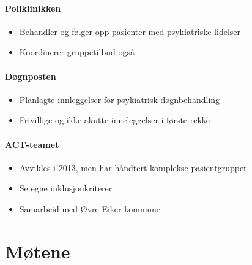 \documentclass[11pt]{report} %
\begin{document}
                        \subsubsection{Poliklinikken}\label{sec:org_kdps_poli}
                          \begin{itemize}
                            \item Behandler og følger opp pasienter med psykiatriske lidelser\\
                            \item Koordinerer gruppetilbud også\\
                          \end{itemize}
                        \subsubsection{Døgnposten}\label{sec:org_kdps_dogn}
                          \begin{itemize}
                            \item Planlagte innleggelser for psykiatrisk døgnbehandling\\
                            \item Frivillige og ikke akutte inneleggelser i første rekke\\
                          \end{itemize}  
                        \subsubsection{ACT-teamet}\label{sec:org_kdps_act}
                          \begin{itemize}
                            \item Avvikles i 2013, men har håndtert komplekse pasientgrupper\\
                            \item Se egne inklusjonkriterer\\
                            \item Samarbeid med Øvre Eiker kommune\\
                          \end{itemize}  
                        
              \chapter{Møtene}\label{chap:m_main}
\end{document}
